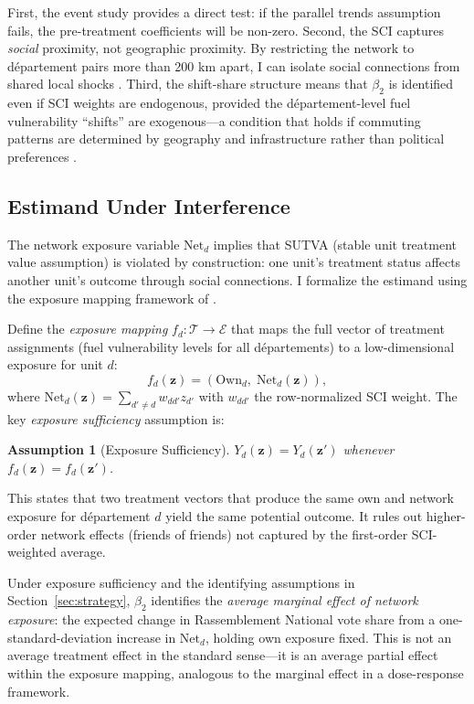 \documentclass[12pt]{article}
\newtheorem{assumption}{Assumption}
\newcommand{\rn}{Rassemblement National}
\newcommand{\dept}{d\'{e}partement}
\newcommand{\depts}{d\'{e}partements}
\begin{document}
First, the event study provides a direct test: if the parallel trends assumption fails, the pre-treatment coefficients will be non-zero. Second, the SCI captures \emph{social} proximity, not geographic proximity. By restricting the network to \dept{} pairs more than 200 km apart, I can isolate social connections from shared local shocks \citep{bailey2020social}. Third, the shift-share structure means that $\beta_2$ is identified even if SCI weights are endogenous, provided the \dept{}-level fuel vulnerability ``shifts'' are exogenous---a condition that holds if commuting patterns are determined by geography and infrastructure rather than political preferences \citep{borusyak2022quasi}.

\subsection{Estimand Under Interference}
\label{sec:estimand}

The network exposure variable $\text{Net}_d$ implies that SUTVA (stable unit treatment value assumption) is violated by construction: one unit's treatment status affects another unit's outcome through social connections. I formalize the estimand using the exposure mapping framework of \citet{aronow2017estimating}.

Define the \emph{exposure mapping} $f_d: \mathcal{T} \to \mathcal{E}$ that maps the full vector of treatment assignments (fuel vulnerability levels for all \depts{}) to a low-dimensional exposure for unit $d$:
\begin{equation}
f_d(\mathbf{z}) = \left(\text{Own}_d, \; \text{Net}_d(\mathbf{z})\right),
\label{eq:exposure_mapping}
\end{equation}
where $\text{Net}_d(\mathbf{z}) = \sum_{d' \neq d} w_{dd'} z_{d'}$ with $w_{dd'}$ the row-normalized SCI weight. The key \emph{exposure sufficiency} assumption is:
\begin{assumption}[Exposure Sufficiency]
$Y_d(\mathbf{z}) = Y_d(\mathbf{z}')$ whenever $f_d(\mathbf{z}) = f_d(\mathbf{z}')$.
\end{assumption}
This states that two treatment vectors that produce the same own and network exposure for \dept{} $d$ yield the same potential outcome. It rules out higher-order network effects (friends of friends) not captured by the first-order SCI-weighted average.

Under exposure sufficiency and the identifying assumptions in Section~\ref{sec:strategy}, $\beta_2$ identifies the \emph{average marginal effect of network exposure}: the expected change in \rn{} vote share from a one-standard-deviation increase in $\text{Net}_d$, holding own exposure fixed. This is not an average treatment effect in the standard sense---it is an average partial effect within the exposure mapping, analogous to the marginal effect in a dose-response framework.
\end{document}
